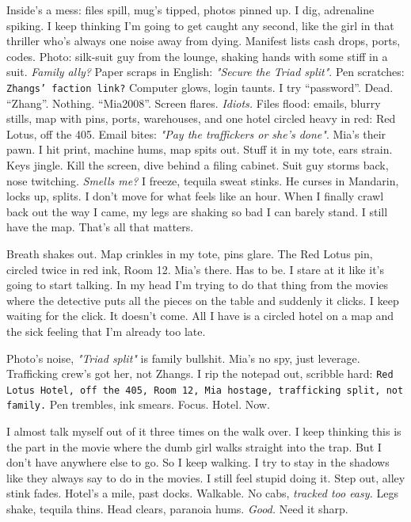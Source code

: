 \documentclass[12pt,oneside]{book}
\newcommand{\note}[1]{\texttt{#1}}
\begin{document}
Inside’s a mess: files spill, mug’s tipped, photos pinned up. I dig, adrenaline spiking. I keep thinking I’m going to get caught any second, like the girl in that thriller who’s always one noise away from dying. Manifest lists cash drops, ports, codes. Photo: silk-suit guy from the lounge, shaking hands with some stiff in a suit. \textit{Family ally?} Paper scraps in English: \textit{"Secure the Triad split"}. Pen scratches: \note{Zhangs’ faction link?} Computer glows, login taunts. I try “password”. Dead. “Zhang”. Nothing. “Mia2008”. Screen flares. \textit{Idiots.} Files flood: emails, blurry stills, map with pins, ports, warehouses, and one hotel circled heavy in red: Red Lotus, off the 405. Email bites: \textit{"Pay the traffickers or she’s done"}. Mia’s their pawn. I hit print, machine hums, map spits out. Stuff it in my tote, ears strain. Keys jingle. Kill the screen, dive behind a filing cabinet. Suit guy storms back, nose twitching. \textit{Smells me?} I freeze, tequila sweat stinks. He curses in Mandarin, locks up, splits. I don’t move for what feels like an hour. When I finally crawl back out the way I came, my legs are shaking so bad I can barely stand. I still have the map. That’s all that matters.

Breath shakes out. Map crinkles in my tote, pins glare. The Red Lotus pin, circled twice in red ink, Room 12. Mia’s there. Has to be. I stare at it like it’s going to start talking. In my head I’m trying to do that thing from the movies where the detective puts all the pieces on the table and suddenly it clicks. I keep waiting for the click. It doesn’t come. All I have is a circled hotel on a map and the sick feeling that I’m already too late.

Photo’s noise, \textit{"Triad split"} is family bullshit. Mia’s no spy, just leverage. Trafficking crew’s got her, not Zhangs. I rip the notepad out, scribble hard: \note{Red Lotus Hotel, off the 405, Room 12, Mia hostage, trafficking split, not family.} Pen trembles, ink smears. Focus. Hotel. Now.

I almost talk myself out of it three times on the walk over. I keep thinking this is the part in the movie where the dumb girl walks straight into the trap. But I don’t have anywhere else to go. So I keep walking. I try to stay in the shadows like they always say to do in the movies. I still feel stupid doing it. Step out, alley stink fades. Hotel’s a mile, past docks. Walkable. No cabs, \textit{tracked too easy.} Legs shake, tequila thins. Head clears, paranoia hums. \textit{Good.} Need it sharp.
\end{document}
